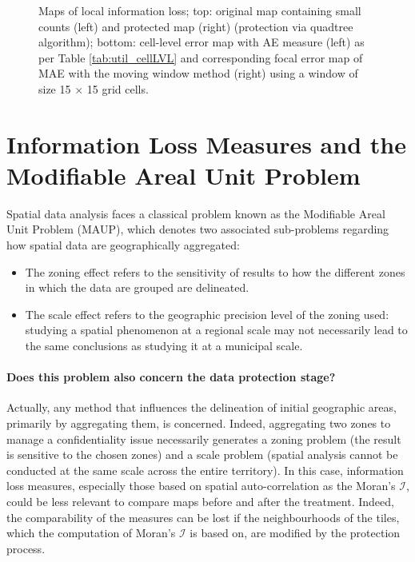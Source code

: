 \begin{figure}
    \caption{Maps of local information loss; top: original map containing small counts (left) and protected map (right) (protection via quadtree algorithm); bottom: cell-level error map with AE measure (left) as per Table \ref{tab:util_cellLVL} and corresponding focal error map of MAE with the moving window method (right) using a window of size 15 $\times$ 15 grid cells.}
    \label{fig:LErr_maps}
\end{figure}


\section{Information Loss Measures and the Modifiable Areal Unit Problem}


Spatial data analysis faces a classical problem known as the Modifiable Areal Unit Problem (MAUP), which denotes two associated sub-problems regarding how spatial data are geographically aggregated:

\begin{itemize}
    \item The zoning effect refers to the sensitivity of results to how the different zones in which the data are grouped are delineated.
    \item The scale effect refers to the geographic precision level of the zoning used: studying a spatial phenomenon at a regional scale may not necessarily lead to the same conclusions as studying it at a municipal scale.
\end{itemize}

\paragraph{Does this problem also concern the data protection stage?}

Actually, any method that influences the delineation of initial geographic areas, primarily by aggregating them, is concerned. Indeed, aggregating two zones to manage a confidentiality issue necessarily generates a zoning problem (the result is sensitive to the chosen zones) and a scale problem (spatial analysis cannot be conducted at the same scale across the entire territory). In this case, information loss measures, especially those based on spatial auto-correlation as the Moran’s $\mathcal{I}$, could be less relevant to compare maps before and after the treatment. Indeed, the comparability of the measures can be lost if the neighbourhoods of the tiles, which the computation of Moran's $\mathcal{I}$ is based on, are modified by the protection process.

